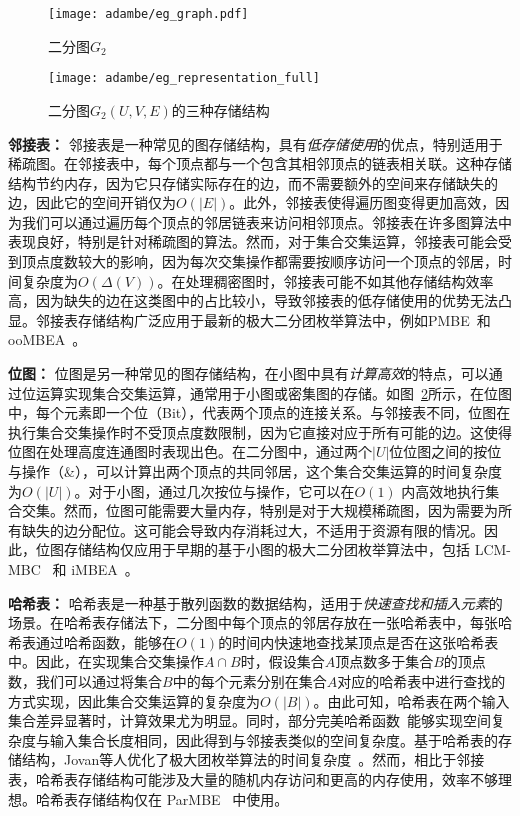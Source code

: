\begin{figure} [H]
  \centering
  \texttt{[image: adambe/eg\_graph.pdf]}
  \caption{二分图$G_2$}
  \label{fig:ada_eg_tree}
\end{figure}


\begin{figure} [H]
	\centering
  \vspace{0.1in}
	\texttt{[image: adambe/eg\_representation\_full]}
  \vspace{0.2in}
	\caption{二分图$G_2(U,V,E)$的三种存储结构}

	\label{fig:ada_graph_format}
\end{figure}

\textbf{邻接表：} 邻接表是一种常见的图存储结构，具有\emph{低存储使用}的优点，特别适用于稀疏图。在邻接表中，每个顶点都与一个包含其相邻顶点的链表相关联。这种存储结构节约内存，因为它只存储实际存在的边，而不需要额外的空间来存储缺失的边，因此它的空间开销仅为$O(|E|)$。此外，邻接表使得遍历图变得更加高效，因为我们可以通过遍历每个顶点的邻居链表来访问相邻顶点。邻接表在许多图算法中表现良好，特别是针对稀疏图的算法。然而，对于集合交集运算，邻接表可能会受到顶点度数较大的影响，因为每次交集操作都需要按顺序访问一个顶点的邻居，时间复杂度为$O(\Delta(V))$。在处理稠密图时，邻接表可能不如其他存储结构效率高，因为缺失的边在这类图中的占比较小，导致邻接表的低存储使用的优势无法凸显。邻接表存储结构广泛应用于最新的极大二分团枚举算法中，例如PMBE~\cite{PMBE20}和ooMBEA~\cite{ooMBE22}。

\textbf{位图：} 位图是另一种常见的图存储结构，在小图中具有\emph{计算高效}的特点，可以通过位运算实现集合交集运算，通常用于小图或密集图的存储。如图~\ref{fig:ada_graph_format}所示，在位图中，每个元素即一个位（Bit），代表两个顶点的连接关系。与邻接表不同，位图在执行集合交集操作时不受顶点度数限制，因为它直接对应于所有可能的边。这使得位图在处理高度连通图时表现出色。在二分图中，通过两个$|U|$位位图之间的按位与操作（\&），可以计算出两个顶点的共同邻居，这个集合交集运算的时间复杂度为$O(|U|)$。对于小图，通过几次按位与操作，它可以在$O(1)$ 内高效地执行集合交集。然而，位图可能需要大量内存，特别是对于大规模稀疏图，因为需要为所有缺失的边分配位。这可能会导致内存消耗过大，不适用于资源有限的情况。因此，位图存储结构仅应用于早期的基于小图的极大二分团枚举算法中，包括 LCM-MBC~\cite{lcmmbc07} 和 iMBEA~\cite{iMBEA14}。

\textbf{哈希表：} 哈希表是一种基于散列函数的数据结构，适用于\emph{快速查找和插入元素}的场景。在哈希表存储法下，二分图中每个顶点的邻居存放在一张哈希表中，每张哈希表通过哈希函数，能够在$O(1)$的时间内快速地查找某顶点是否在这张哈希表中。因此，在实现集合交集操作$A \cap B$时，假设集合$A$顶点数多于集合$B$的顶点数，我们可以通过将集合$B$中的每个元素分别在集合$A$对应的哈希表中进行查找的方式实现，因此集合交集运算的复杂度为$O(|B|)$。由此可知，哈希表在两个输入集合差异显著时，计算效果尤为明显。同时，部分完美哈希函数~\cite{cuckoohash04,murmurhash}能够实现空间复杂度与输入集合长度相同，因此得到与邻接表类似的空间复杂度。基于哈希表的存储结构，Jovan等人优化了极大团枚举算法的时间复杂度~\cite{MCE20}。然而，相比于邻接表，哈希表存储结构可能涉及大量的随机内存访问和更高的内存使用，效率不够理想。哈希表存储结构仅在 ParMBE~\cite{parMBE19} 中使用。



